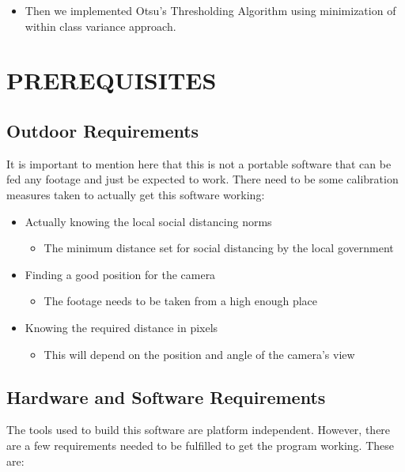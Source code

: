 \documentclass[a4paper]{article}
\begin{document}
\begin{itemize}
    \pagebreak

    \item Then we implemented Otsu's Thresholding Algorithm \cite{4310076} using minimization of within class variance approach. 

    
    
\end{itemize}

\pagebreak

\section{PREREQUISITES}

\subsection{Outdoor Requirements}
It is important to mention here that this is not a portable software that can
be fed any footage and just be expected to work. There need to be some
calibration measures taken to actually get this software working:

\begin{itemize}
    \item Actually knowing the local social distancing norms
          \begin{itemize}
              \item The minimum distance set for social distancing by the local government
          \end{itemize}

    \item Finding a good position for the camera
          \begin{itemize}
              \item The footage needs to be taken from a high enough place
          \end{itemize}

    \item Knowing the required distance in pixels
          \begin{itemize}
              \item This will depend on the position and angle of the camera's view
          \end{itemize}
\end{itemize}

\subsection{Hardware and Software Requirements}
The tools used to build this software are platform independent. However,
there are a few requirements needed to be fulfilled to get the program
working. These are:
\end{document}
